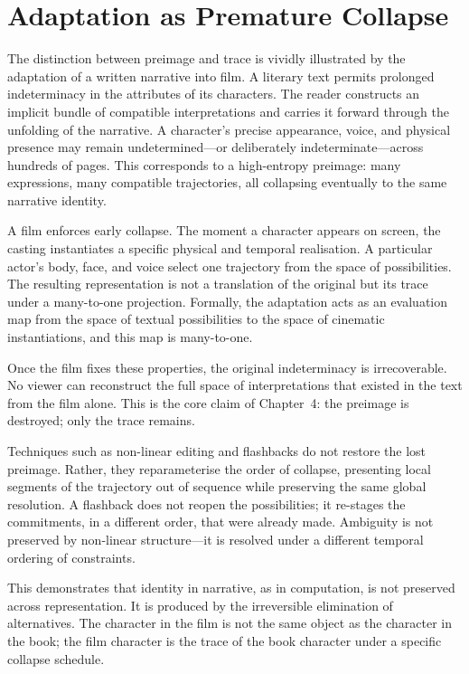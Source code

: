\documentclass[12pt, oneside]{amsbook}
\theoremstyle{plain}
\theoremstyle{definition}
\theoremstyle{remark}
\begin{document}
\section{Adaptation as Premature Collapse}

The distinction between preimage and trace is vividly illustrated by the
adaptation of a written narrative into film. A literary text permits prolonged
indeterminacy in the attributes of its characters. The reader constructs an
implicit bundle of compatible interpretations and carries it forward through
the unfolding of the narrative. A character's precise appearance, voice, and
physical presence may remain undetermined---or deliberately indeterminate---across
hundreds of pages. This corresponds to a high-entropy preimage: many expressions,
many compatible trajectories, all collapsing eventually to the same narrative
identity.

A film enforces early collapse. The moment a character appears on screen, the
casting instantiates a specific physical and temporal realisation. A particular
actor's body, face, and voice select one trajectory from the space of
possibilities. The resulting representation is not a translation of the
original but its trace under a many-to-one projection. Formally, the adaptation
acts as an evaluation map from the space of textual possibilities to the space
of cinematic instantiations, and this map is many-to-one.

Once the film fixes these properties, the original indeterminacy is irrecoverable.
No viewer can reconstruct the full space of interpretations that existed in the
text from the film alone. This is the core claim of Chapter~4: the preimage is
destroyed; only the trace remains.

Techniques such as non-linear editing and flashbacks do not restore the lost
preimage. Rather, they reparameterise the order of collapse, presenting local
segments of the trajectory out of sequence while preserving the same global
resolution. A flashback does not reopen the possibilities; it re-stages the
commitments, in a different order, that were already made. Ambiguity is not
preserved by non-linear structure---it is resolved under a different temporal
ordering of constraints.

This demonstrates that identity in narrative, as in computation, is not
preserved across representation. It is produced by the irreversible elimination
of alternatives. The character in the film is not the same object as the
character in the book; the film character is the trace of the book character
under a specific collapse schedule.
\end{document}
